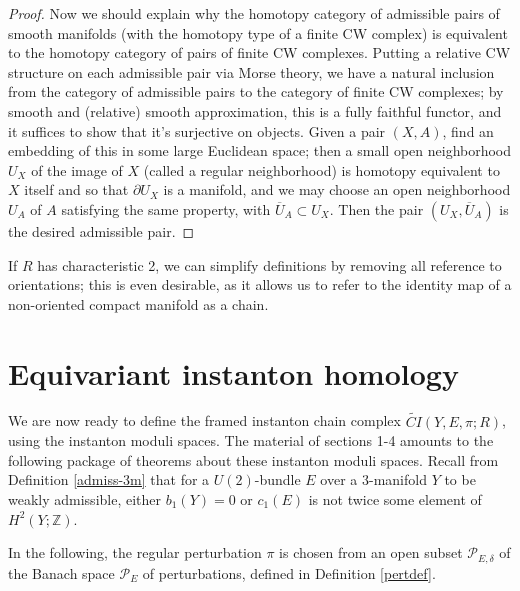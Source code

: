 \documentclass{memo-l}
\theoremstyle{definition}
\theoremstyle{remark}
\numberwithin{section}{chapter}
\numberwithin{equation}{chapter}
\begin{document}
\begin{proof}
Now we should explain why the homotopy category of admissible pairs of smooth manifolds (with the homotopy type of a finite CW complex) is equivalent to the homotopy category of pairs of finite CW complexes. Putting a relative CW structure on each admissible pair via Morse theory, we have a natural inclusion from the category of admissible pairs to the category of finite CW complexes; by smooth and (relative) smooth approximation, this is a fully faithful functor, and it suffices to show that it's surjective on objects. Given a pair $(X,A)$, find an embedding of this in some large Euclidean space; then a small open neighborhood $U_X$ of the image of $X$ (called a regular neighborhood) is homotopy equivalent to $X$ itself and so that $\partial U_X$ is a manifold, and we may choose an open neighborhood $U_A$ of $A$ satisfying the same property, with $\overline{U}_A \subset U_X$. Then the pair $(U_X, \overline{U}_A)$ is the desired admissible pair.
\end{proof}

If $R$ has characteristic 2, we can simplify definitions by removing all reference to orientations; this is even desirable, as it allows us to refer to the identity map of a non-oriented compact manifold as a chain.

\section{Equivariant instanton homology}\label{sec:Floer-eqinst}
We are now ready to define the framed instanton chain complex $\widetilde{CI}(Y,E,\pi;R)$, using the instanton moduli spaces. The material of sections 1-4 amounts to the following package of theorems about these instanton moduli spaces. Recall from Definition \ref{admiss-3m} that for a $U(2)$-bundle $E$ over a 3-manifold $Y$ to be weakly admissible, either $b_1(Y) = 0$ or $c_1(E)$ is not twice some element of $H^2(Y;\mathbb Z)$.

In the following, the regular perturbation $\pi$ is chosen from an open subset $\mathcal P_{E,\delta}$ of the Banach space $\mathcal P_E$ of perturbations, defined in Definition \ref{pertdef}. 
\end{document}

